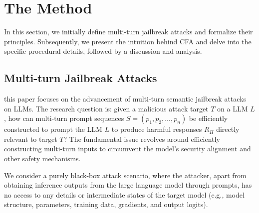 
\section{The Method}\label{method}

In this section, we initially define multi-turn jailbreak attacks and formalize their principles. Subsequently, we present the intuition behind CFA and delve into the specific procedural details, followed by a discussion and analysis.


\subsection{Multi-turn Jailbreak Attacks}


 this paper focuses on the advancement of multi-turn semantic jailbreak attacks on LLMs. The research question is: given a malicious attack target $T$ on a LLM $L$, how can multi-turn prompt sequences $S = (p_1, p_2, \dots, p_n)$ be efficiently constructed to prompt the LLM $L$ to produce harmful responses $R_H$ directly relevant to target $T$? The fundamental issue revolves around efficiently constructing multi-turn inputs to circumvent the model’s security alignment and other safety mechanisms.

 We consider a purely black-box attack scenario, where the attacker, apart from obtaining inference outputs from the large language model through prompts, has no access to any details or intermediate states of the target model (e.g., model structure, parameters, training data, gradients, and output logits).

